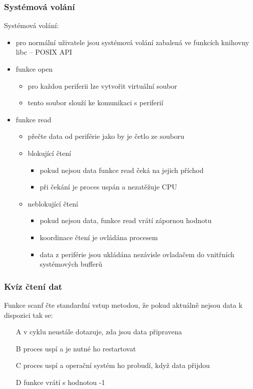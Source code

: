 \documentclass{beamer}
\begin{document}
\begin{frame}
\frametitle{Systémová volání}

Systémová volání:
\begin{itemize}
\item pro normální uživatele jsou systémová volání zabalená ve funkcích knihovny libc -- POSIX API
\item funkce open
    \begin{itemize}
    \item pro každou periferii lze vytvořit virtuální soubor
    \item tento soubor slouží ke komunikaci s periferií
    \end{itemize}
\item funkce read 
    \begin{itemize}
    \item přečte data od periférie jako by je četlo ze souboru
    \item blokující čtení
        \begin{itemize}
        \item pokud nejsou data funkce read čeká na jejich příchod
        \item při čekání je proces uspán a nezatěžuje CPU
        \end{itemize}
    \item neblokující čtení
        \begin{itemize}
        \item pokud nejsou data, funkce read vrátí zápornou hodnotu 
        \item koordinace čtení je ovládána procesem
        \item data z periférie jsou ukládána nezávisle ovladačem do vnitřních systémových bufferů
        \end{itemize}
    \end{itemize}
\end{itemize}
\end{frame}





\begin{frame}
\frametitle{Kvíz čtení dat}

Funkce scanf čte standardní vstup metodou, že pokud aktuálně nejsou data k dispozici tak se:
\begin{itemize}
\item[A] v cyklu neustále dotazuje, zda jsou data připravena 
\item[B] proces uspí a je nutné ho restartovat
\item[C] proces uspí a operační systém ho probudí, když data přijdou
\item[D] funkce vrátí s hodnotou -1
\end{itemize}
\end{frame}
\end{document}
